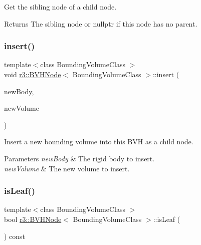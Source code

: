 Get the sibling node of a child node. 

\begin{DoxyReturn}{Returns}
The sibling node or nullptr if this node has no parent. 
\end{DoxyReturn}
\mbox{\label{classr3_1_1_b_v_h_node_ab6f91727e36689a7edc9f8c168ab904b}} 
\subsubsection{\texorpdfstring{insert()}{insert()}}
{\footnotesize\ttfamily template$<$class Bounding\+Volume\+Class $>$ \\
void \mbox{\hyperlink{classr3_1_1_b_v_h_node}{r3\+::\+B\+V\+H\+Node}}$<$ Bounding\+Volume\+Class $>$\+::insert (\begin{DoxyParamCaption}\item[{\mbox{\hyperlink{classr3_1_1_rigid_body}{Rigid\+Body}} $\ast$}]{new\+Body,  }\item[{const Bounding\+Volume\+Class \&}]{new\+Volume }\end{DoxyParamCaption})\hspace{0.3cm}{\ttfamily [protected]}}



Insert a new bounding volume into this B\+VH as a child node. 


\begin{DoxyParams}{Parameters}
{\em new\+Body} & The rigid body to insert. \\
\hline
{\em new\+Volume} & The new volume to insert. \\
\hline
\end{DoxyParams}
\mbox{\label{classr3_1_1_b_v_h_node_a517b40f1a91cda371b3cb786f1c7e155}} 
\subsubsection{\texorpdfstring{is\+Leaf()}{isLeaf()}}
{\footnotesize\ttfamily template$<$class Bounding\+Volume\+Class $>$ \\
bool \mbox{\hyperlink{classr3_1_1_b_v_h_node}{r3\+::\+B\+V\+H\+Node}}$<$ Bounding\+Volume\+Class $>$\+::is\+Leaf (\begin{DoxyParamCaption}{ }\end{DoxyParamCaption}) const}



